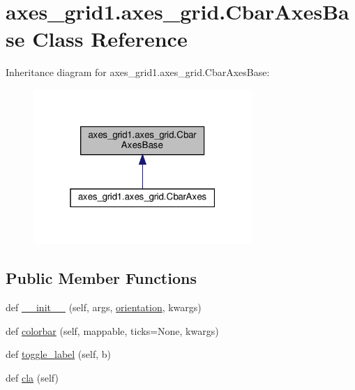 \hypertarget{classaxes__grid1_1_1axes__grid_1_1CbarAxesBase}{}\section{axes\+\_\+grid1.\+axes\+\_\+grid.\+Cbar\+Axes\+Base Class Reference}
\label{classaxes__grid1_1_1axes__grid_1_1CbarAxesBase}


Inheritance diagram for axes\+\_\+grid1.\+axes\+\_\+grid.\+Cbar\+Axes\+Base\+:
\nopagebreak
\begin{figure}[H]
\begin{center}
\leavevmode
\includegraphics[width=235pt]{classaxes__grid1_1_1axes__grid_1_1CbarAxesBase__inherit__graph}
\end{center}
\end{figure}
\subsection*{Public Member Functions}
\begin{DoxyCompactItemize}
\item 
def \hyperlink{classaxes__grid1_1_1axes__grid_1_1CbarAxesBase_a4c21fc42794765e22ca9bb6aadb9c502}{\+\_\+\+\_\+init\+\_\+\+\_\+} (self, args, \hyperlink{classaxes__grid1_1_1axes__grid_1_1CbarAxesBase_a3d11bd8175ae29cce5a045478cb94567}{orientation}, kwargs)
\item 
def \hyperlink{classaxes__grid1_1_1axes__grid_1_1CbarAxesBase_a824372fe98e84c58618f4a8fa7c8bd97}{colorbar} (self, mappable, ticks=None, kwargs)
\item 
def \hyperlink{classaxes__grid1_1_1axes__grid_1_1CbarAxesBase_a4ca69bcbb1c4674be657806e95cd3b49}{toggle\+\_\+label} (self, b)
\item 
def \hyperlink{classaxes__grid1_1_1axes__grid_1_1CbarAxesBase_a66a5e95866da12f94723be4d995615d2}{cla} (self)
\end{DoxyCompactItemize}
